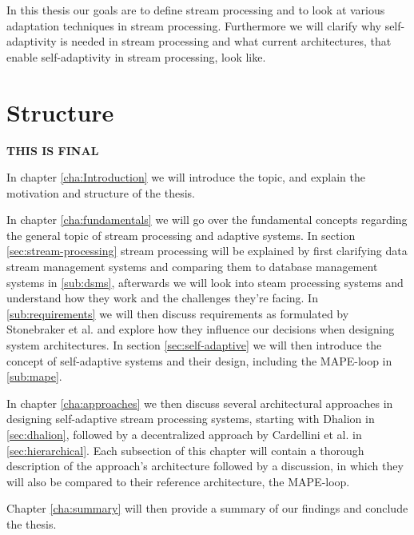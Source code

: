 In this thesis our goals are to define stream processing and to look at various adaptation techniques in stream processing. Furthermore we will clarify why
self-adaptivity is needed in stream processing and what current architectures, that enable self-adaptivity in stream processing, look like.


\section{Structure}
\label{sec:structure}
\textbf{\color{green}THIS IS FINAL}

In chapter \ref{cha:Introduction} we will introduce the topic, and explain the motivation and structure of the thesis.

In chapter \ref{cha:fundamentals} we will go over the fundamental concepts regarding the general topic of stream processing and adaptive systems.
In section \ref{sec:stream-processing} stream processing will be explained by first clarifying data stream management systems and comparing them to database management systems 
in \ref{sub:dsms}, afterwards we will look into steam processing systems and understand how they work and the challenges they're facing.
In \ref{sub:requirements} we will then discuss requirements as formulated by Stonebraker et al. and explore how they influence our decisions when designing system architectures.
In section \ref{sec:self-adaptive} we will then introduce the concept of self-adaptive systems and their design, including the MAPE-loop in \ref{sub:mape}.

In chapter \ref{cha:approaches} we then discuss several architectural approaches in designing self-adaptive stream processing systems, starting with Dhalion in \ref{sec:dhalion}, 
followed by a decentralized approach by Cardellini et al. in \ref{sec:hierarchical}.
Each subsection of this chapter will contain a thorough description of the approach's architecture followed by a discussion, 
in which they will also be compared to their reference architecture, the MAPE-loop.

Chapter \ref{cha:summary} will then provide a summary of our findings and conclude the thesis.